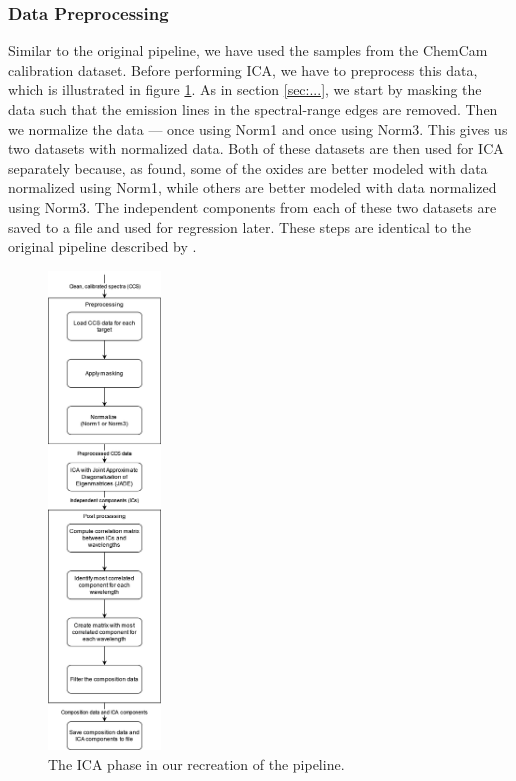 \subsubsection{Data Preprocessing}
Similar to the original pipeline, we have used the samples from the ChemCam calibration dataset.
Before performing ICA, we have to preprocess this data, which is illustrated in figure \ref{fig:ica_data}.
As in section \ref{sec:...}, we start by masking the data such that the emission lines in the spectral-range edges are removed. %
Then we normalize the data --- once using Norm1 and once using Norm3.
This gives us two datasets with normalized data.
Both of these datasets are then used for ICA separately because, as \citeauthor{cleggRecalibrationMarsScience2017} found, some of the oxides are better modeled with data normalized using Norm1, while others are better modeled with data normalized using Norm3.
The independent components from each of these two datasets are saved to a file and used for regression later.
These steps are identical to the original pipeline described by \citeauthor{cleggRecalibrationMarsScience2017}.

\begin{figure}
	\centering
	\includegraphics[width=0.2675\textwidth]{images/ica_data.png}
	\caption{The ICA phase in our recreation of the pipeline.}
	\label{fig:ica_data}
\end{figure}

